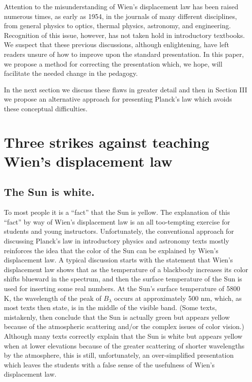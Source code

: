 \documentclass[12pt,aps,prb,preprint]{revtex4}   %
\begin{document}
Attention to the misunderstanding of Wien's displacement law has been raised numerous times, as early as 1954, in the journals of many different disciplines, from general physics to optics, thermal physics, astronomy, and 
engineering.\cite{Bracewell,Ross,Chiu,Brecher,LS,SL,Over,Heald,ZW,Stewart}  Recognition of this issue, however, has not taken hold in introductory textbooks.  We suspect that these previous discussions, although enlightening, have left readers unsure of how to improve upon the standard presentation.  In this paper, we propose a method for correcting the presentation which, we hope, will facilitate the needed change in the pedagogy. 


In the next section we discuss these flaws in greater detail and then in Section III we propose an alternative approach for presenting Planck's law which avoids these conceptual difficulties.  

\section{Three strikes against teaching Wien's displacement law}

\subsection{The Sun is white.}

To most people it is a ``fact'' that the Sun is yellow.  The explanation of this ``fact'' by way of Wien's displacement law is an all too-tempting exercise for students and young instructors.  Unfortunately, the conventional approach for discussing Planck's law in introductory physics and astronomy texts mostly reinforces the idea that the color of the Sun can be explained by Wien's displacement law.  A typical discussion starts with the statement that Wien's displacement law shows that as the temperature of a blackbody increases its color shifts blueward in the spectrum, and then the surface temperature of the Sun is used for inserting some real numbers.  At the Sun's surface temperature of 5800 K, the wavelength of the peak of $B_\lambda$ occurs at approximately 500 nm, which, as most texts then state, is in the middle of the visible band.  (Some texts, mistakenly, then conclude that the Sun is actually green but appears yellow because of the atmospheric scattering and/or the complex issues of color vision.\cite{CK,IH})  Although many texts correctly explain that the Sun is white but appears yellow when at lower elevations because of the greater scattering of shorter wavelengths by the atmosphere,\cite{PF} this is still, unfortunately, an over-simplified presentation which leaves the students with a false sense of the usefulness of Wien's displacement law. 
\end{document}
